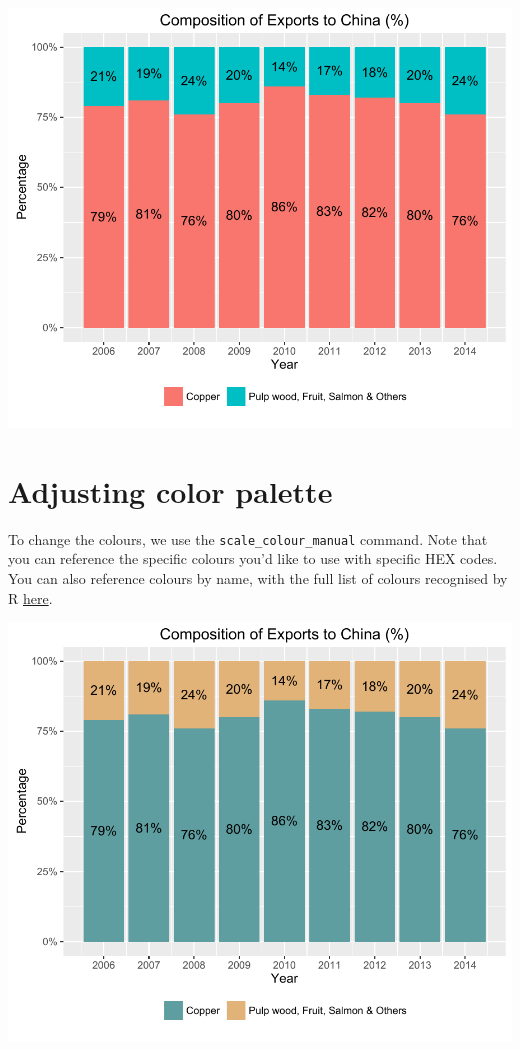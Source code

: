 \begin{center}\includegraphics[width=0.6\linewidth]{4_Stacked_Bar_pdf/stacked_7-1} \end{center}

\section{Adjusting color palette}\label{adjusting-color-palette}

To change the colours, we use the \texttt{scale\_colour\_manual}
command. Note that you can reference the specific colours you'd like to
use with specific HEX codes. You can also reference colours by name,
with the full list of colours recognised by R
\href{http://www.stat.columbia.edu/~tzheng/files/Rcolor.pdf}{here}.

\begin{Shaded}
\begin{Highlighting}[]
\StringTok{ }\NormalTok{(}\NormalTok{, }\NormalTok{)}
\StringTok{ }\StringTok{ }\NormalTok{(}
\end{Highlighting}
\end{Shaded}

\begin{center}\includegraphics[width=0.6\linewidth]{4_Stacked_Bar_pdf/stacked_8-1} \end{center}

